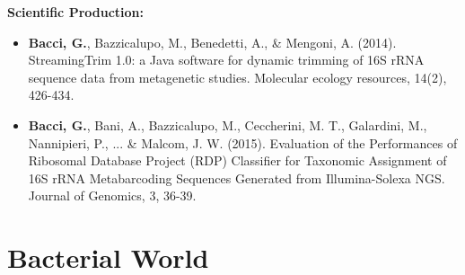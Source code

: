 \documentclass[10pt]{beamer}
\begin{document}
\begin{frame}
	\textbf{\Large{Scientific Production:}}
	\begin{itemize}
		\item \textbf{Bacci, G.}, Bazzicalupo, M., Benedetti, A., \& Mengoni, A. (2014). StreamingTrim 1.0: a Java software for dynamic trimming of 16S rRNA sequence data from metagenetic studies. Molecular ecology resources, 14(2), 426-434.
		\item \textbf{Bacci, G.}, Bani, A., Bazzicalupo, M., Ceccherini, M. T., Galardini, M., Nannipieri, P., ... \& Malcom, J. W. (2015). Evaluation of the Performances of Ribosomal Database Project (RDP) Classifier for Taxonomic Assignment of 16S rRNA Metabarcoding Sequences Generated from Illumina-Solexa NGS. Journal of Genomics, 3, 36-39.
	\end{itemize}
\end{frame}

\section{Bacterial World}
\subsection{}
\newif\ifsseek
\sseekfalse
\end{document}
